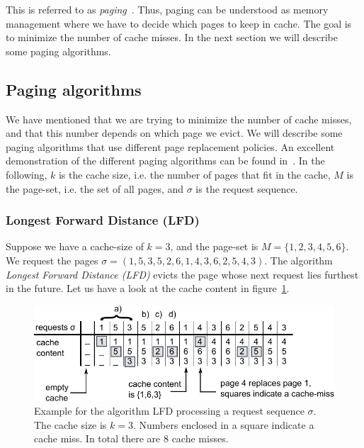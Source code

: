 \documentclass[a4paper,12pt, titlepage]{article}  %
\begin{document}
This is referred to as \emph{paging}~\cite{albers99_brics}. Thus, paging can be understood as memory management where
we have to decide which pages to keep in cache. The goal is to minimize the number of cache misses. 
In the next section we will describe some paging algorithms.


\subsection{Paging algorithms}
We have mentioned that we are trying to minimize the number of cache misses, and that this number
depends on which page we evict. We will describe some paging algorithms that use different page 
replacement policies. An excellent demonstration of the different paging algorithms can be found 
in~\cite{johncctang}. In the following, $k$ is the cache size, i.e. the number of pages that fit in the 
cache, $M$ is the page-set, i.e. the set of all pages, and $\sigma$ is the request sequence.

\subsubsection{Longest Forward Distance (LFD)}
\label{sec:lfd} 
Suppose we have a cache-size of $k=3$, and the page-set is $M=\{1,2,3,4,5,6\}$.
We request the pages $\sigma=(1,5,3,5,2,6,1,4,3,6,2,5,4,3)$. The algorithm \emph{Longest Forward Distance
(LFD)} evicts the page whose next request lies furthest in the future. Let us have a look at the cache content
in figure~\ref{fig:LFD_example}.

\begin{figure}[h]
	\centering
	\includegraphics{./figures/LFD_example.pdf}
	\caption{Example for the algorithm LFD processing a request sequence $\sigma$. 
	         The cache size is $k=3$. Numbers enclosed in a square indicate a cache miss.
	         In total there are 8 cache misses.}
	\label{fig:LFD_example}
\end{figure}
\end{document}
